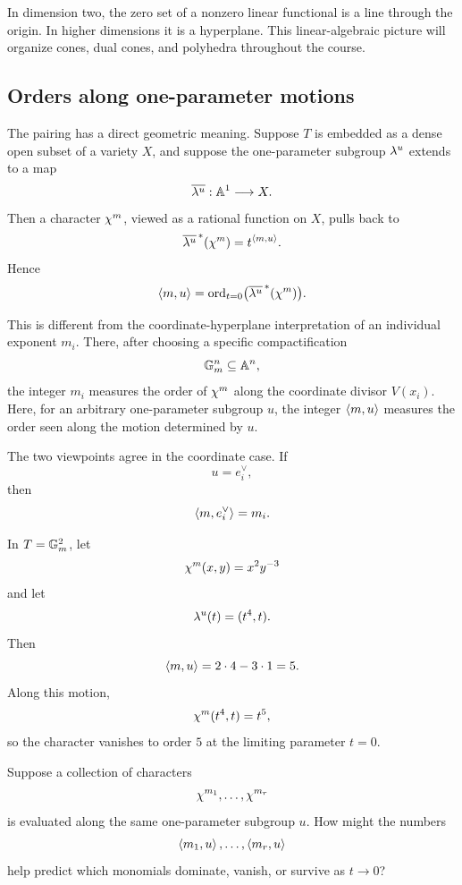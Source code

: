 \begin{observation}
In dimension two, the zero set of a nonzero linear functional is a
line through the origin. In higher dimensions it is a hyperplane.
This linear-algebraic picture will organize cones, dual cones, and
polyhedra throughout the course.
\end{observation}

\subsection{Orders along one-parameter motions}

The pairing has a direct geometric meaning. Suppose \(T\) is embedded
as a dense open subset of a variety \(X\), and suppose the
one-parameter subgroup \(\lambda^{u}\) extends to a map
\[
\overline{\lambda^{u}}:\mathbb{A}^1\longrightarrow X.
\]
Then a character \(\chi^{m}\), viewed as a rational function on
\(X\), pulls back to
\[
\overline{\lambda^{u}}^{\,*}(\chi^{m})
=
t^{\left\langle m,u\right\rangle}.
\]
Hence
\[
\left\langle m,u\right\rangle
=
\operatorname{ord}_{t=0}
\bigl(\overline{\lambda^{u}}^{\,*}(\chi^{m})\bigr).
\]

This is different from the coordinate-hyperplane interpretation of an
individual exponent \(m_i\). There, after choosing a specific
compactification
\[
\mathbb{G}_{m}^n\subseteq\mathbb{A}^n,
\]
the integer \(m_i\) measures the order of \(\chi^{m}\) along the
coordinate divisor \(V(x_i)\). Here, for an arbitrary one-parameter
subgroup \(u\), the integer \(\left\langle m,u\right\rangle\) measures the order seen
along the motion determined by \(u\).

The two viewpoints agree in the coordinate case. If
\[
u=e_i^\vee,
\]
then
\[
\left\langle m,e_i^\vee\right\rangle=m_i.
\]

\begin{example}
In \(T=\mathbb{G}_{m}^2\), let
\[
\chi^{m}(x,y)=x^2y^{-3}
\]
and let
\[
\lambda^{u}(t)=(t^4,t).
\]
Then
\[
\left\langle m,u\right\rangle
=
2\cdot4-3\cdot1
=
5.
\]
Along this motion,
\[
\chi^{m}(t^4,t)=t^5,
\]
so the character vanishes to order \(5\) at the limiting parameter
\(t=0\).
\end{example}

\begin{prediction}
Suppose a collection of characters
\[
\chi^{m_1},\ldots,\chi^{m_r}
\]
is evaluated along the same one-parameter subgroup \(u\). How might
the numbers
\[
\left\langle m_1,u\right\rangle,\ldots,\left\langle m_r,u\right\rangle
\]
help predict which monomials dominate, vanish, or survive as
\(t\to0\)?
\end{prediction}

